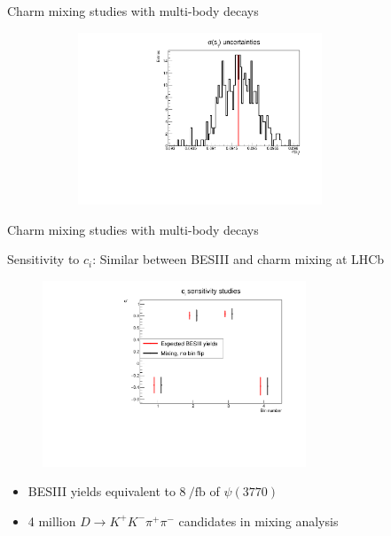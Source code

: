 \documentclass[xcolor={dvipsnames}]{beamer}
\begin{document}
\begin{frame}{Charm mixing studies with multi-body decays}
\begin{figure}[htb]
\begin{subfigure}{0.5\textwidth}
      \includegraphics[width=0.8\textwidth]{Plots/s_1_err_binflip_hist.pdf}
    \end{subfigure}
    \vspace{-0.5cm}
  \end{figure}
\end{frame}

\begin{frame}{Charm mixing studies with multi-body decays}
  \begin{center}
    {\large Sensitivity to $c_i$: Similar between BESIII and charm mixing at LHCb}
  \end{center}
  \begin{figure}[htb]
    \centering
    \includegraphics[width=0.7\textwidth]{Plots/ci_sensitivity.pdf}
  \end{figure}
  \vspace{-0.4cm}
  \begin{itemize}
    \item{BESIII yields equivalent to $\SI{8}{\per\femto\barn}$ of $\psi(3770)$}
    \item{4 million $D\to K^+K^-\pi^+\pi^-$ candidates in mixing analysis}
    \end{itemize}
\end{frame}
\end{document}
